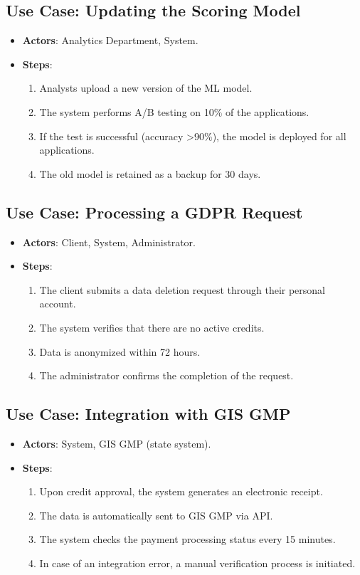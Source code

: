 \documentclass[a4paper,12pt]{article}
\begin{document}
\subsection*{Use Case: Updating the Scoring Model}
\begin{itemize}
    \item \textbf{Actors}: Analytics Department, System.
    \item \textbf{Steps}:
    \begin{enumerate}
        \item Analysts upload a new version of the ML model.
        \item The system performs A/B testing on 10\% of the applications.
        \item If the test is successful (accuracy >90\%), the model is deployed for all applications.
        \item The old model is retained as a backup for 30 days.
    \end{enumerate}
\end{itemize}

\subsection*{Use Case: Processing a GDPR Request}
\begin{itemize}
    \item \textbf{Actors}: Client, System, Administrator.
    \item \textbf{Steps}:
    \begin{enumerate}
        \item The client submits a data deletion request through their personal account.
        \item The system verifies that there are no active credits.
        \item Data is anonymized within 72 hours.
        \item The administrator confirms the completion of the request.
    \end{enumerate}
\end{itemize}

\subsection*{Use Case: Integration with GIS GMP}
\begin{itemize}
    \item \textbf{Actors}: System, GIS GMP (state system).
    \item \textbf{Steps}:
    \begin{enumerate}
        \item Upon credit approval, the system generates an electronic receipt.
        \item The data is automatically sent to GIS GMP via API.
        \item The system checks the payment processing status every 15 minutes.
        \item In case of an integration error, a manual verification process is initiated.
    \end{enumerate}
\end{itemize}
\end{document}
